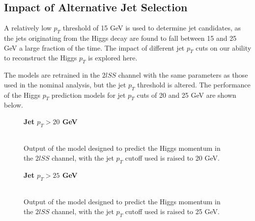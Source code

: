 \subsection{Impact of Alternative Jet Selection}
\label{subsec:ptCutApx}

A relatively low $p_T$ threshold of 15 GeV is used to determine jet candidates, as the jets originating from the Higgs decay are found to fall between 15 and 25 GeV a large fraction of the time. The impact of different jet $p_T$ cuts on our ability to reconstruct the Higgs $p_T$ is explored here. 

The models are retrained in the $2lSS$ channel with the same parameters as those used in the nominal analysis, but the jet $p_T$ threshold is altered. The performance of the Higgs $p_T$ prediction models for jet $p_T$ cuts of 20 and 25 GeV are shown below.

\begin{figure}[H]
    \centering
    \textbf{Jet $p_T > 20$ GeV}
    \\           
    \\                       
    \caption{Output of the model designed to predict the Higgs momentum in the $2lSS$ channel, with the jet $p_T$ cutoff used is raised to 20 GeV.}
    \label{fig:pt2lSS_20}
\end{figure} 

\begin{figure}[H]
    \centering
    \textbf{Jet $p_T > 25$ GeV}
    \\
    \\
    \caption{Output of the model designed to predict the Higgs momentum in the $2lSS$ channel, with the jet $p_T$ cutoff used is raised to 25 GeV.}
    \label{fig:pt2lSS_25}
\end{figure}

